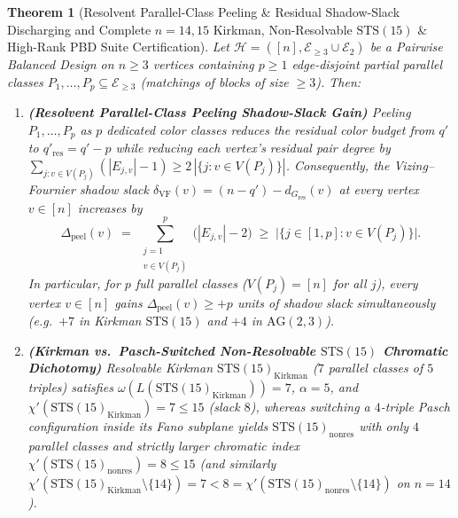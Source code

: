 \documentclass[11pt,reqno]{amsart}
\newtheorem{theorem}{Theorem}[section]
\theoremstyle{definition}
\theoremstyle{remark}
\begin{document}
\begin{theorem}[Resolvent Parallel-Class Peeling \& Residual Shadow-Slack Discharging and Complete $n = 14, 15$ Kirkman, Non-Resolvable $\mathrm{STS}(15)$ \& High-Rank PBD Suite Certification]\label{thm:parallel_class_kirkman15}
Let $\mathcal{H} = ([n], \mathcal{E}_{\ge 3} \cup \mathcal{E}_2)$ be a Pairwise Balanced Design on $n \ge 3$ vertices containing $p \ge 1$ edge-disjoint partial parallel classes $P_1, \dots, P_p \subseteq \mathcal{E}_{\ge 3}$ (matchings of blocks of size $\ge 3$). Then:
\begin{enumerate}
  \item[\textup{(a)}] \textbf{(Resolvent Parallel-Class Peeling Shadow-Slack Gain)} Peeling $P_1, \dots, P_p$ as $p$ dedicated color classes reduces the residual color budget from $q'$ to $q'_{\mathrm{res}} = q' - p$ while reducing each vertex's residual pair degree by $\sum_{j : v \in V(P_j)} (|E_{j,v}| - 1) \ge 2\,|\{j : v \in V(P_j)\}|$. Consequently, the Vizing--Fournier shadow slack $\delta_{\mathrm{VF}}(v) = (n - q') - d_{G_{\mathrm{res}}}(v)$ at every vertex $v \in [n]$ increases by
  \begin{equation}\label{eq:parallel_peel_slack}
    \Delta_{\mathrm{peel}}(v) \;=\; \sum_{\substack{j=1 \\ v \in V(P_j)}}^p \bigl(|E_{j,v}| - 2\bigr) \;\ge\; \bigl|\{j \in [1, p] : v \in V(P_j)\}\bigr|.
  \end{equation}
  In particular, for $p$ full parallel classes ($V(P_j) = [n]$ for all $j$), every vertex $v \in [n]$ gains $\Delta_{\mathrm{peel}}(v) \ge +p$ units of shadow slack simultaneously (e.g.\ $+7$ in Kirkman $\mathrm{STS}(15)$ and $+4$ in $\mathrm{AG}(2,3)$).
  \item[\textup{(b)}] \textbf{(Kirkman vs.\ Pasch-Switched Non-Resolvable $\mathrm{STS}(15)$ Chromatic Dichotomy)} Resolvable Kirkman $\mathrm{STS}(15)_{\mathrm{Kirkman}}$ ($7$ parallel classes of $5$ triples) satisfies $\omega(L(\mathrm{STS}(15)_{\mathrm{Kirkman}})) = 7$, $\alpha = 5$, and $\chi'(\mathrm{STS}(15)_{\mathrm{Kirkman}}) = 7 \le 15$ (slack $8$), whereas switching a $4$-triple Pasch configuration inside its Fano subplane yields $\mathrm{STS}(15)_{\mathrm{nonres}}$ with only $4$ parallel classes and strictly larger chromatic index $\chi'(\mathrm{STS}(15)_{\mathrm{nonres}}) = 8 \le 15$ (and similarly $\chi'(\mathrm{STS}(15)_{\mathrm{Kirkman}}\setminus\{14\}) = 7 < 8 = \chi'(\mathrm{STS}(15)_{\mathrm{nonres}}\setminus\{14\})$ on $n = 14$).

\end{enumerate}
\end{theorem}
\end{document}
